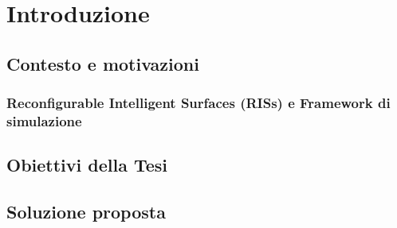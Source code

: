 \chapter{Introduzione}
\label{ch:introduzione}

\section{Contesto e motivazioni}
\label{sec:contesto}

\subsection{Reconfigurable Intelligent Surfaces (RISs) e Framework di
simulazione}
\label{subsec:risframework}

\lipsum[1]

\lipsum[1]

\section{Obiettivi della Tesi}
\label{sec:obiettivi}

\lipsum[1]

\section{Soluzione proposta}
\label{sec:soluzione}

\lipsum[1]